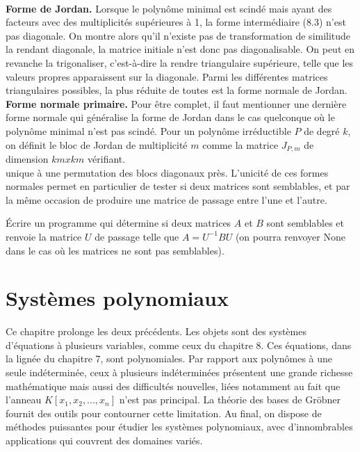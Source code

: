 \\
\textbf{Forme de Jordan.} Lorsque le polynôme minimal est scindé mais ayant des
facteurs avec des multiplicités supérieures à 1, la forme intermédiaire (8.3) n’est
pas diagonale. On montre alors qu’il n’existe pas de transformation de similitude
la rendant diagonale, la matrice initiale n’est donc pas diagonalisable. On peut
en revanche la trigonaliser, c’est-à-dire la rendre triangulaire supérieure, telle que
les valeurs propres apparaissent sur la diagonale. Parmi les différentes matrices
triangulaires possibles, la plus réduite de toutes est la forme normale de Jordan.
\\
\textbf{Forme normale primaire.} Pour être complet, il faut mentionner une dernière
forme normale qui généralise la forme de Jordan dans le cas quelconque où le
polynôme minimal n’est pas scindé. Pour un polynôme irréductible $P$ de degré $k$,
on définit le bloc de Jordan de multiplicité $m$ comme la matrice $J_{P,m}$ de dimension
$km x km$ vérifiant.
\\
unique à une permutation des blocs diagonaux près. L’unicité de ces formes normales permet en particulier de tester si deux matrices sont semblables, et par la même occasion de produire une matrice de
passage entre l’une et l’autre.

\begin{exercise}
Écrire un programme qui détermine si deux matrices $A$ et $B$ sont semblables et renvoie la matrice $U$ de passage telle que $A = U^{-1}BU$ (on pourra renvoyer None dans le cas où les matrices ne sont pas semblables).
\end{exercise}

\chapter{Systèmes polynomiaux}
Ce chapitre prolonge les deux précédents. Les objets sont des systèmes d’équations à plusieurs variables, comme ceux du chapitre 8. Ces équations, dans la lignée du chapitre 7, sont polynomiales. Par rapport aux polynômes à une seule indéterminée, ceux à plusieurs indéterminées présentent une grande richesse mathématique mais aussi des difficultés nouvelles, liées notamment au fait que l’anneau $K\left[x_{1}, x_{2}, ..., x_{n}\right] $ n’est pas principal. La théorie des bases de Gröbner fournit des outils pour contourner cette limitation. Au final, on dispose de méthodes puissantes pour étudier les systèmes polynomiaux, avec d’innombrables applications
qui couvrent des domaines variés.
\\

